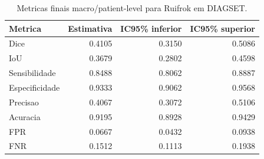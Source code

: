 \begin{table}[!htb]
\centering
\caption{Metricas finais macro/patient-level para Ruifrok em DIAGSET.}
\label{tab:results_diagset-macro-ruifrok}
\small
\begin{tabular}{lrrr}
\toprule
Metrica & Estimativa & IC95\% inferior & IC95\% superior \\
\midrule
Dice & 0.4105 & 0.3150 & 0.5086 \\
IoU & 0.3679 & 0.2802 & 0.4598 \\
Sensibilidade & 0.8488 & 0.8062 & 0.8887 \\
Especificidade & 0.9333 & 0.9062 & 0.9568 \\
Precisao & 0.4067 & 0.3072 & 0.5106 \\
Acuracia & 0.9195 & 0.8928 & 0.9429 \\
FPR & 0.0667 & 0.0432 & 0.0938 \\
FNR & 0.1512 & 0.1113 & 0.1938 \\
\bottomrule
\end{tabular}
\end{table}
